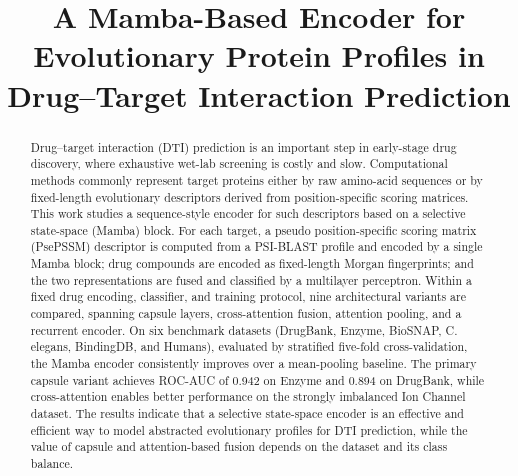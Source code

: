\documentclass[conference]{IEEEtran}
\begin{document}
\title{A Mamba-Based Encoder for Evolutionary Protein
Profiles in Drug--Target Interaction Prediction}

\author{
\and
{}
\and
{}
}

\maketitle

\begin{abstract}
Drug--target interaction (DTI) prediction is an important step in early-stage
drug discovery, where exhaustive wet-lab screening is costly and slow.
Computational methods commonly represent target proteins either by raw
amino-acid sequences or by fixed-length evolutionary descriptors derived from
position-specific scoring matrices. This work studies a sequence-style encoder
for such descriptors based on a selective state-space (Mamba) block. For each
target, a pseudo position-specific scoring matrix (PsePSSM) descriptor is
computed from a PSI-BLAST profile and encoded by a single Mamba block; drug
compounds are encoded as fixed-length Morgan fingerprints; and the two representations
are fused and classified by a multilayer perceptron. Within a fixed drug
encoding, classifier, and training protocol, nine architectural variants are
compared, spanning capsule layers, cross-attention fusion, attention pooling,
and a recurrent encoder. On six benchmark datasets (DrugBank, Enzyme, BioSNAP, C. elegans, BindingDB, and Humans),
evaluated by stratified five-fold cross-validation, the Mamba encoder consistently improves
over a mean-pooling baseline. The primary capsule variant achieves ROC-AUC of 0.942 on Enzyme
and 0.894 on DrugBank, while cross-attention enables better performance on the strongly
imbalanced Ion Channel dataset. The results indicate that a selective state-space encoder is
an effective and efficient way to model abstracted evolutionary profiles for DTI
prediction, while the value of capsule and attention-based fusion depends on the
dataset and its class balance.
\end{abstract}
\end{document}
